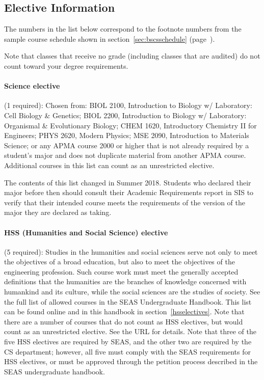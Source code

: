 \subsection{Elective Information}
\label{sec:electiveinfo}

The numbers in the list below correspond to the footnote numbers from
the sample course schedule shown in section~\ref{sec:bscsschedule}
(page~\pageref{sec:bscsschedule}).

Note that classes that receive no grade (including classes that are
audited) do not count toward your degree requirements.

\paragraph{Science elective} (1 required): Chosen from:
  BIOL 2100, Introduction to Biology w/ Laboratory: Cell Biology \& Genetics; BIOL 2200, Introduction to Biology w/ Laboratory: Organismal \& Evolutionary Biology;
  CHEM 1620, Introductory Chemistry II for Engineers;
  PHYS 2620, Modern Physics;
  MSE 2090, Introduction to Materials Science;
  or any APMA course 2000 or higher that is not already required by a student’s major and does not duplicate material from another APMA course.
  Additional courses in this list can count as an unrestricted
  elective.
  
  The contents of this list changed in Summer 2018. Students who declared their major before then should consult their Academic Requirements report in SIS to verify that their intended course meets the requirements of the version of the major they are declared as taking.

\paragraph{HSS (Humanities and Social Science) elective} (5 required): 
  Studies in the humanities and social sciences serve not only to meet
  the objectives of a broad education, but also to meet the objectives
  of the engineering profession. Such course work must meet the
  generally accepted definitions that the humanities are the branches
  of knowledge concerned with humankind and its culture, while the
  social sciences are the studies of society. See the full list of
  allowed courses in the SEAS Undergraduate Handbook. This list can be
  found
  online
  and in this handbook in section~\ref{hsselectives}. Note that there
  are a number of courses that do not count as HSS electives, but
  would count as an unrestricted elective. See the URL for details.
  Note that three of the five HSS electives are required by SEAS, and
  the other two are required by the CS department; however, all five
  must comply with the SEAS requirements for HSS electives, or must be
  approved through the petition process described in the SEAS
  undergraduate handbook.

